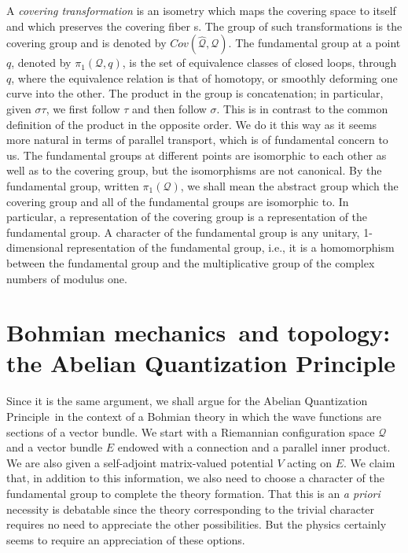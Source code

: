 \documentclass[11pt]{article}
\theoremstyle{remark}
\begin{document}
A \emph{covering transformation} is an isometry which maps the covering
space to itself and which preserves the covering fiber s.  The group of such
transformations is the covering group and is denoted by \ensuremath{Cov(\ensuremath{\widehat{\ensuremath{\mathcal{Q}}}}, \ensuremath{\mathcal{Q}})}. 
The fundamental group at a point \ensuremath{q}, denoted
by \ensuremath{\pi_1 ({\ensuremath{\mathcal{Q}}, \ensuremath{q}})},
is the set of 
equivalence classes 
of closed loops, through \ensuremath{q}, where the equivalence relation is
that of homotopy, 
or smoothly deforming one curve into the other. 
The product in the group is concatenation; in particular, given
$\sigma \tau$, we first follow $\tau$ and then follow $\sigma$. This
is in contrast to the common definition of the product in the opposite
order. We do it this way as it seems more natural in terms of parallel
transport, which is of fundamental concern to us. 
The fundamental groups
at different points are isomorphic to each other as well as to the
covering group, but the isomorphisms are not canonical. 
By the fundamental group, written \ensuremath{\pi_1 ({\ensuremath{\mathcal{Q}}})}, we shall mean the
abstract group 
which the covering group and all of the fundamental groups are
isomorphic to.  In particular, a representation of the covering group
is a representation of the fundamental group. A character of the
fundamental group is any unitary, 1-dimensional representation of the
fundamental group, i.e., it is a homomorphism between the fundamental
group and the multiplicative group of the complex numbers of modulus
one. 

\section[AQP]{Bohmian mechanics\ and topology:\\ the Abelian Quantization Principle} \label{s:expo}


Since it is the same argument, we shall argue for the Abelian Quantization Principle\ in the
context of a 
 Bohmian theory in which the wave functions are sections of a vector bundle. We
start with a Riemannian configuration space $\ensuremath{\mathcal{Q}}$ and
 a vector bundle $E$ endowed with a connection and a parallel inner
product. We are also given a self-adjoint matrix-valued potential $V$
acting on $E$. We claim that, in addition to this information, we also
need to choose a character of the fundamental group to complete the
theory formation. That this is an \emph{a priori} necessity is
debatable since the theory corresponding to 
 the trivial character requires no need to
appreciate the other possibilities. But the physics certainly seems to
require an appreciation of these options.
\end{document}
